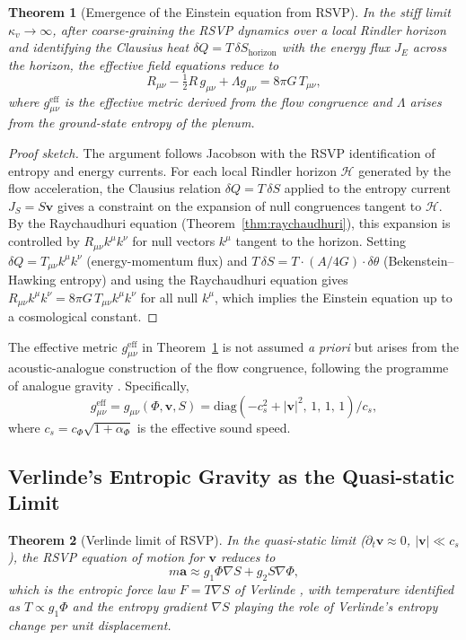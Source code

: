 \documentclass[12pt, a4paper]{article}
\theoremstyle{plain}
\newtheorem{theorem}{Theorem}[section]
\theoremstyle{definition}
\theoremstyle{remark}
\newcommand{\vfield}{\mathbf{v}}
\newcommand{\geff}{g_{\mu\nu}^{\mathrm{eff}}}
\begin{document}
\begin{theorem}[Emergence of the Einstein equation from RSVP]
\label{thm:einstein}
In the stiff limit $\kappa_v \to \infty$, after coarse-graining the RSVP dynamics over
a local Rindler horizon and identifying the Clausius heat $\delta Q = T\,\delta S_{\mathrm{horizon}}$
with the energy flux $J_E$ across the horizon, the effective field equations reduce to
\[
R_{\mu\nu} - \tfrac{1}{2}R\,g_{\mu\nu} + \Lambda g_{\mu\nu} = 8\pi G\,T_{\mu\nu},
\]
where $g_{\mu\nu}^{\mathrm{eff}}$ is the effective metric derived from the flow congruence
and $\Lambda$ arises from the ground-state entropy of the plenum.
\end{theorem}

\begin{proof}[Proof sketch]
The argument follows Jacobson \cite{Jacobson1995} with the RSVP identification of
entropy and energy currents.  For each local Rindler horizon $\mathcal{H}$ generated by
the flow acceleration, the Clausius relation $\delta Q = T\,\delta S$ applied to the
entropy current $J_S = S\vfield$ gives a constraint on the expansion of null congruences
tangent to $\mathcal{H}$.  By the Raychaudhuri equation (Theorem~\ref{thm:raychaudhuri}),
this expansion is controlled by $R_{\mu\nu}k^\mu k^\nu$ for null vectors $k^\mu$ tangent
to the horizon.  Setting $\delta Q = T_{\mu\nu}k^\mu k^\nu$ (energy-momentum flux)
and $T\,\delta S = T\cdot(A/4G)\cdot\delta\theta$ (Bekenstein--Hawking entropy) and
using the Raychaudhuri equation gives $R_{\mu\nu}k^\mu k^\nu = 8\pi G\,T_{\mu\nu}k^\mu k^\nu$
for all null $k^\mu$, which implies the Einstein equation up to a cosmological constant.
\end{proof}

The effective metric $g_{\mu\nu}^{\mathrm{eff}}$ in Theorem~\ref{thm:einstein} is not
assumed \textit{a priori} but arises from the acoustic-analogue construction of the flow
congruence, following the programme of analogue gravity \cite{Barcelo2005, Visser1998}.
Specifically,
\[
\geff = g_{\mu\nu}(\Phi, \vfield, S)
= \mathrm{diag}\!\left(-c_s^2 + |\vfield|^2,\,1,\,1,\,1\right)/c_s,
\]
where $c_s = c_\Phi\sqrt{1 + \alpha_\Phi}$ is the effective sound speed.

\subsection{Verlinde's Entropic Gravity as the Quasi-static Limit}

\begin{theorem}[Verlinde limit of RSVP]
\label{thm:verlinde}
In the quasi-static limit ($\partial_t\vfield \approx 0$, $|\vfield| \ll c_s$), the RSVP
equation of motion for $\vfield$ reduces to
\[
m\mathbf{a} \approx g_1\Phi\nabla S + g_2 S\nabla\Phi,
\]
which is the entropic force law $F = T\nabla S$ of Verlinde \cite{Verlinde2011},
with temperature identified as $T \propto g_1\Phi$ and the entropy gradient $\nabla S$
playing the role of Verlinde's entropy change per unit displacement.
\end{theorem}
\end{document}
